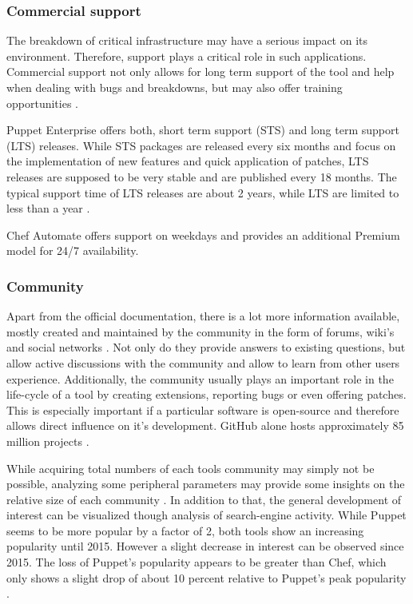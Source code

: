 \subsubsection{Commercial support}

The breakdown of critical infrastructure may have a serious impact on its environment. Therefore, support plays a critical role in such applications. Commercial support not only allows for long term support of the tool and help when dealing with bugs and breakdowns, but may also offer training opportunities \cite{delaet2010survey}.

Puppet Enterprise offers both, short term support (STS) and long term support (LTS) releases. While STS packages are released every six months and focus on the implementation of new features and quick application of patches, LTS releases are supposed to be very stable and are published every 18 months. The typical support time of LTS releases are about 2 years, while LTS are limited to less than a year \cite{puppetcomenterpriselifecycle}.

Chef Automate offers support on weekdays and provides an additional Premium model for 24/7 availability.

\subsubsection{Community}

Apart from the official documentation, there is a lot more information available, mostly created and maintained by the community in the form of forums, wiki's and social networks \cite{delaet2010survey}. Not only do they provide answers to existing questions, but allow active discussions with the community and allow to learn from other users experience. Additionally, the community usually plays an important role in the life-cycle of a tool by creating extensions, reporting bugs or even offering patches. This is especially important if a particular software is open-source and therefore allows direct influence on it's development. GitHub alone hosts approximately 85 million projects \cite{githubabout}.

While acquiring total numbers of each tools community may simply not be possible, analyzing some peripheral parameters may provide some insights on the relative size of each community \cite{pandey2012investigating}. In addition to that, the general development of interest can be visualized though analysis of search-engine activity. While Puppet seems to be more popular by a factor of 2, both tools show an increasing popularity until 2015. However a slight decrease in interest can be observed since 2015. The loss of Puppet's popularity appears to be greater than Chef, which only shows a slight drop of about 10 percent relative to Puppet's peak popularity \cite{googlepuppetvschef}.